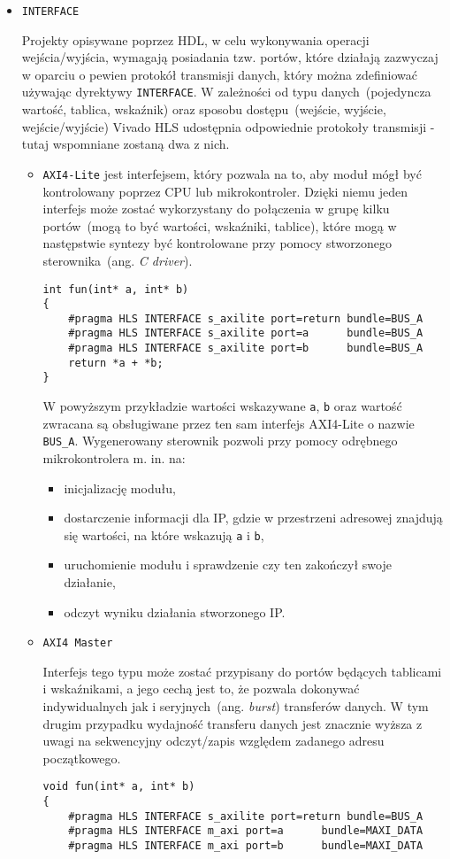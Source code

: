 \begin{itemize}
\item \texttt{INTERFACE}

Projekty opisywane poprzez HDL, w celu wykonywania operacji wejścia/wyjścia, wymagają posiadania tzw. portów, które działają zazwyczaj w oparciu o pewien protokół transmisji danych, który można zdefiniować używając dyrektywy \texttt{INTERFACE}. W zależności od typu danych~(pojedyncza wartość, tablica, wskaźnik) oraz sposobu dostępu~(wejście, wyjście, wejście/wyjście) Vivado HLS udostępnia odpowiednie protokoły transmisji - tutaj wspomniane zostaną dwa z nich.
\begin{itemize}
\item \texttt{AXI4-Lite} jest interfejsem, który pozwala na to, aby moduł mógł być kontrolowany poprzez CPU lub mikrokontroler. Dzięki niemu jeden interfejs może zostać wykorzystany do połączenia w grupę kilku portów~(mogą to być wartości, wskaźniki, tablice), które mogą w następstwie syntezy być kontrolowane przy pomocy stworzonego sterownika~(ang. \textit{C driver}). 
\begin{lstlisting}[caption=Przykład użycia interfejsu AXI4-Lite]
int fun(int* a, int* b)
{
	#pragma HLS INTERFACE s_axilite port=return bundle=BUS_A
	#pragma HLS INTERFACE s_axilite port=a 		bundle=BUS_A
	#pragma HLS INTERFACE s_axilite port=b 		bundle=BUS_A
	return *a + *b;
}
\end{lstlisting}
W powyższym przykładzie wartości wskazywane \texttt{a}, \texttt{b} oraz wartość zwracana są obsługiwane przez ten sam interfejs AXI4-Lite o nazwie \texttt{BUS\_A}. Wygenerowany sterownik pozwoli przy pomocy odrębnego mikrokontrolera m. in. na:
\begin{itemize}
\item inicjalizację modułu,
\item dostarczenie informacji dla IP, gdzie w przestrzeni adresowej znajdują się wartości, na które wskazują \texttt{a} i \texttt{b},
\item uruchomienie modułu i sprawdzenie czy ten zakończył swoje działanie,
\item odczyt wyniku działania stworzonego IP.
\end{itemize}
\item \texttt{AXI4 Master}

Interfejs tego typu może zostać przypisany do portów będących tablicami i wskaźnikami, a jego cechą jest to, że pozwala dokonywać indywidualnych jak i seryjnych~(ang. \textit{burst}) transferów danych. W tym drugim przypadku wydajność transferu danych jest znacznie wyższa z uwagi na sekwencyjny odczyt/zapis względem zadanego adresu początkowego.
\begin{lstlisting}[caption=Przykład użycia interfejsu AXI4 Master z seryjnym dostępem do danych. Zmiana adresów wskazywanych umożliwiona została poprzez interfejs AXI4-Lite]
void fun(int* a, int* b)
{
	#pragma HLS INTERFACE s_axilite port=return bundle=BUS_A
	#pragma HLS INTERFACE m_axi port=a 		bundle=MAXI_DATA
	#pragma HLS INTERFACE m_axi port=b 		bundle=MAXI_DATA


\end{lstlisting}
\end{itemize}
\end{itemize}
